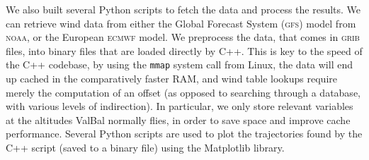 \documentclass[11pt]{scrartcl} %
\begin{document}
We also built several Python scripts to fetch the data and process the results. We can retrieve wind data from either the Global Forecast System (\textsc{gfs}) model from \textsc{noaa}, or the European \textsc{ecmwf} model. We preprocess the data, that comes in \textsc{grib} files, into binary files that are loaded directly by C++. This is key to the speed of the C++ codebase, by using the \texttt{mmap} system call from Linux, the data will end up cached in the comparatively faster RAM, and wind table lookups require merely the computation of an offset (as opposed to searching through a database, with various levels of indirection). In particular, we only store relevant variables at the altitudes ValBal normally flies, in order to save space and improve cache performance. Several Python scripts are used to plot the trajectories found by the C++ script (saved to a binary file) using the Matplotlib library.

\newpage
\printbibliography
\end{document}
